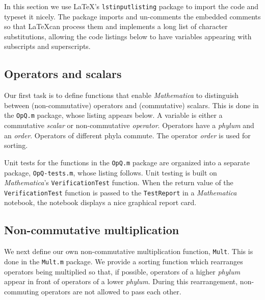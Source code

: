 
In this section we use \LaTeX{}'s \verb+lstinputlisting+ package to import the code and typeset it nicely.
The package imports and un-comments the embedded comments so that \LaTeX can process them and implements a long list of character substitutions, allowing the code listings below to have variables appearing with subscripts and superscripts.

\subsection{Operators and scalars}

Our first task is to define functions that enable \emph{Mathematica} to distinguish between (non-commutative) operators and (commutative) scalars. 
This is done in the \verb+OpQ.m+ package, whose listing appears below. 
A variable is either a commutative \emph{scalar} or non-commutative \emph{operator}.
Operators have a \emph{phylum} and an \emph{order}.
Operators of different phyla commute.
The operator \emph{order} is used for sorting.



Unit tests for the functions in the \verb+OpQ.m+ package are organized into a separate package, \verb+OpQ-tests.m+, whose listing follows. 
Unit testing is built on \emph{Mathematica}'s \verb+VerificationTest+ function.
When the return value of the \verb+VerificationTest+ function is passed to the \verb+TestReport+ in a \emph{Mathematica} notebook, the notebook displays a nice graphical report card.




\subsection{Non-commutative multiplication}

We next define our own non-commutative multiplication function, \verb+Mult+.
This is done in the \verb+Mult.m+ package.
We provide a sorting function which rearranges operators being multiplied so that, if possible, operators of a higher \emph{phylum} appear in front of operators of a lower \emph{phylum}.
During this rearrangement, non-commuting operators are not allowed to pass each other.

